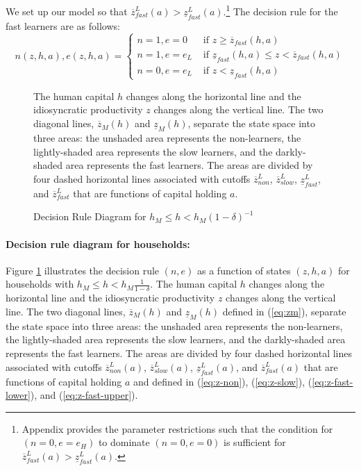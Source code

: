 \documentclass[12pt]{article}
\begin{document}
We set up our model so that $\overline{z}^L_{fast}(a)>\underline{z}^L_{fast}(a)$.\footnote{Appendix provides the parameter restrictions such that the condition for $(n=0,e=e_H)$ to dominate $(n=0,e=0)$ is sufficient for $\overline{z}^L_{fast}(a)>\underline{z}^L_{fast}(a)$.} The decision rule for the fast learners are as follows:
\begin{equation}
n(z,h,a),e(z,h,a) =\left \{ 
\begin{array}{cl}
n=1,e=0  & \text{ if } z \geq \overline{z}_{fast}(h,a) \\
n=1,e=e_L & \text{ if } \underline{z}_{fast}(h,a) \leq z<\overline{z}_{fast}(h,a) \\
n=0,e=e_L & \text{ if } z<\underline{z}_{fast}(h,a)
\end{array}%
\right.
\end{equation}


\begin{figure}
    \centering
    

\caption{Decision Rule Diagram for $h_M \leq h<h_M(1-\delta)^{-1}$}
\begin{flushleft}
\footnotesize{The human capital $h$ changes along the horizontal line and the idiosyncratic productivity $z$ changes along the vertical line. The two diagonal lines, $\overline{z}_M(h)$ and $\underline{z}_M(h)$, separate the state space into three areas: the unshaded area represents the non-learners, the lightly-shaded area represents the slow learners, and the darkly-shaded  area represents the fast learners. The areas are divided by four dashed horizontal lines associated with cutoffs $\overline{z}^L_{non}$, $\overline{z}^L_{slow}$, $\underline{z}^L_{fast}$, and $\overline{z}^L_{fast}$ that are functions of capital holding $a$.} 
\end{flushleft}
    
\label{fig:rule-diagram}
\end{figure}

\paragraph{Decision rule diagram for households:}Figure \ref{fig:rule-diagram} illustrates the decision rule $(n,e)$ as a function of states $(z,h,a)$ for households with $h_M \leq h<h_M\frac{1}{1-\delta}$. The human capital $h$ changes along the horizontal line and the idiosyncratic productivity $z$ changes along the vertical line. The two diagonal lines, $\overline{z}_M(h)$ and $\underline{z}_M(h)$ defined in (\ref{eq:zm}), separate the state space into three areas: the unshaded area represents the non-learners, the lightly-shaded area represents the slow learners, and the darkly-shaded area represents the fast learners. The areas are divided by four dashed horizontal lines associated with cutoffs $\overline{z}^L_{non}(a)$, $\overline{z}^L_{slow}(a)$, $\underline{z}^L_{fast}(a)$, and $\overline{z}^L_{fast}(a)$ that are functions of capital holding $a$ and defined in (\ref{eq:z-non}), (\ref{eq:z-slow}), (\ref{eq:z-fast-lower}), and (\ref{eq:z-fast-upper}).
\end{document}
